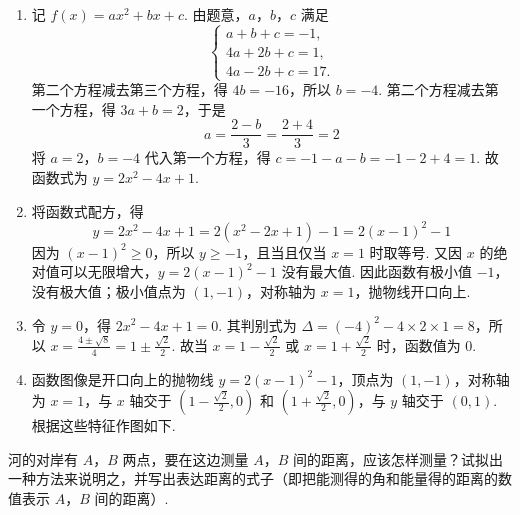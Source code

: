\begin{solution}
\begin{enumerate}
\item 记 \(f(x)=ax^{2}+bx+c\). 由题意，\(a\)，\(b\)，\(c\) 满足
\[
\begin{cases}
a+b+c=-1,\\
4a+2b+c=1,\\
4a-2b+c=17.
\end{cases}
\]
第二个方程减去第三个方程，得 \(4b=-16\)，所以 \(b=-4\). 第二个方程减去第一个方程，得 \(3a+b=2\)，于是
\[
a=\frac{2-b}{3}=\frac{2+4}{3}=2
\]
将 \(a=2\)，\(b=-4\) 代入第一个方程，得 \(c=-1-a-b=-1-2+4=1\). 故函数式为 \(y=2x^{2}-4x+1\).

\item 将函数式配方，得
\[
y=2x^{2}-4x+1=2\left(x^{2}-2x+1\right)-1=2\left(x-1\right)^{2}-1
\]
因为 \(\left(x-1\right)^{2}\geq 0\)，所以 \(y\geq-1\)，且当且仅当 \(x=1\) 时取等号. 又因 \(x\) 的绝对值可以无限增大，\(y=2\left(x-1\right)^{2}-1\) 没有最大值. 因此函数有极小值 \(-1\)，没有极大值；极小值点为 \(\left(1,-1\right)\)，对称轴为 \(x=1\)，抛物线开口向上.

\item 令 \(y=0\)，得 \(2x^{2}-4x+1=0\). 其判别式为 \(\Delta=(-4)^{2}-4\times2\times1=8\)，所以 \(x=\frac{4\pm\sqrt{8}}{4}=1\pm\frac{\sqrt{2}}{2}\).
故当 \(x=1-\frac{\sqrt{2}}{2}\) 或 \(x=1+\frac{\sqrt{2}}{2}\) 时，函数值为 \(0\).

\item 函数图像是开口向上的抛物线 \(y=2\left(x-1\right)^{2}-1\)，顶点为 \(\left(1,-1\right)\)，对称轴为 \(x=1\)，与 \(x\) 轴交于 \(\left(1-\frac{\sqrt{2}}{2},0\right)\) 和 \(\left(1+\frac{\sqrt{2}}{2},0\right)\)，与 \(y\) 轴交于 \(\left(0,1\right)\). 根据这些特征作图如下.
\end{enumerate}
\end{solution}

\begin{problem}
河的对岸有 \(A\)，\(B\) 两点，要在这边测量 \(A\)，\(B\) 间的距离，应该怎样测量？试拟出一种方法来说明之，并写出表达距离的式子（即把能测得的角和能量得的距离的数值表示 \(A\)，\(B\) 间的距离）.
\end{problem}

